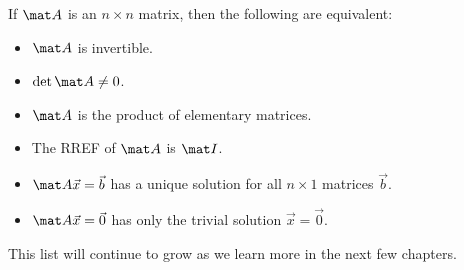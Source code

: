 \begin{fact}
    If $\mat A$ is an $n \times n$ matrix, then the following are equivalent:
    \begin{itemize}
        \item $\mat A$ is invertible.
        \item $\det{\mat A} \neq 0$.
        \item $\mat A$ is the product of elementary matrices.
        \item The RREF of $\mat A$ is $\mat I$.
        \item $\mat A \vec x = \vec b$ has a unique solution for all $n \times 1$ matrices $\vec b$.
        \item $\mat A \vec x = \vec 0$ has only the trivial solution $\vec x = \vec 0$.
    \end{itemize}
\end{fact}

This list will continue to grow as we learn more in the next few chapters.